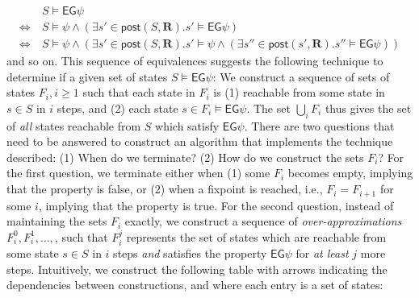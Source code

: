 \documentclass[10pt]{article}
\newcommand{\ctrans}{\ensuremath{\mathbf{R}}\xspace}
\newcommand{\eg}[1]{\ensuremath{\mathsf{EG}#1\xspace}}
\newcommand{\post}[2]{\ensuremath{\mathsf{post}(#1, #2)}\xspace}
\begin{document}
\begin{spacing}{1}
\begin{eqnarray*}[ll]
& \ S \models \eg{\psi}\\
\Leftrightarrow & \ S \models \psi \wedge (\exists s' \in
\post{S}{\ctrans}. s' \models \eg{\psi})\\
\Leftrightarrow & \ S \models \psi \wedge (\exists s' \in
\post{S}{\ctrans}. s' \models \psi \wedge (\exists s'' \in
\post{s'}{\ctrans}. s'' \models \eg{\psi}))
\end{eqnarray*}
and so on. This sequence of equivalences suggests the following technique
to determine if a given set of states $S \models \eg{\psi}$: We construct a
sequence of sets of states $F_i, i \geq 1$ such that each state in $F_i$ is (1)
reachable from some state in $s \in S$ in $i$ steps, and (2)
each state $s \in F_i \models \eg{\psi}$. The set $\bigcup_i F_i$ thus
gives the set of \emph{all} states reachable from $S$ which satisfy
$\eg{\psi}$. There are two questions that need to be answered to construct
an algorithm that implements the technique described: (1) When do we
terminate? (2) How do we construct the sets $F_i$? For the first question,
we terminate either when (1) some $F_i$ becomes empty, implying that the
property is false, or (2) when a fixpoint is reached, i.e., $F_i = F_{i+1}$
for some $i$, implying that the property is true. For the second question,
instead of maintaining the sets $F_i$ exactly, we construct a sequence of
\emph{over-approximations} $F_i^0, F_i^1, \ldots,$, such that $F_i^j$
represents the set of states which are reachable from some state $s \in S$
in $i$ steps \emph{and} satisfies the property \eg{\psi} for \emph{at
  least} $j$ more steps. Intuitively, we construct the following table with
arrows indicating the dependencies between constructions, and where each
entry is a set of states:


\end{spacing}
\end{document}

